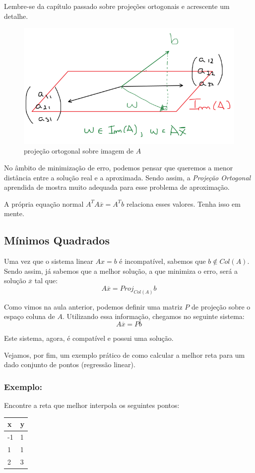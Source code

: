 \documentclass[12pt]{article}
\begin{document}
	Lembre-se da capítulo passado sobre projeções ortogonais e acrescente um detalhe.
	
	\begin{figure}[H]
		\centering
		\includegraphics[width=0.4\linewidth]{Imagens/projOrtogEsp}
		\caption{projeção ortogonal sobre imagem de $A$}
		\label{fig:projortogesp}
	\end{figure}
	
	No âmbito de minimização de erro, podemos pensar que queremos a menor distância entre a solução real e a aproximada. Sendo assim, a \textit{Projeção Ortogonal} aprendida de mostra muito adequada para esse problema de aproximação.
	
	A própria equação normal $A^TA\overline{x}=A^Tb$ relaciona esses valores. Tenha isso em mente.
	
	\subsection{Mínimos Quadrados}
	
	Uma vez que o sistema linear $Ax=b$ é incompatível, sabemos que $b \notin Col(A)$. Sendo assim, já sabemos que a melhor solução, a que minimiza o erro, será a solução $\overline{x}$ tal que:
	\begin{equation*}
		A\overline{x}=Proj_{Col(A)}b
	\end{equation*}
	
	Como vimos na aula anterior, podemos definir uma matriz $P$ de projeção sobre o espaço coluna de $A$. Utilizando essa informação, chegamos no seguinte sistema:
	\begin{equation*}
		A\overline{x}=Pb
	\end{equation*}
	
	Este sistema, agora, é compatível e possui uma solução.
	
	Vejamos, por fim, um exemplo prático de como calcular a melhor reta para um dado conjunto de pontos (regressão linear).
	
	\subsubsection{Exemplo:}
	Encontre a reta que melhor interpola os seguintes pontos:
	\begin{table}[]
		\centering
		\begin{tabular}{|l|l|}
			\hline
			x  & y \\ \hline
			-1 & 1 \\ \hline
			1  & 1 \\ \hline
			2  & 3 \\ \hline
		\end{tabular}
	\end{table}
	
\end{document}
